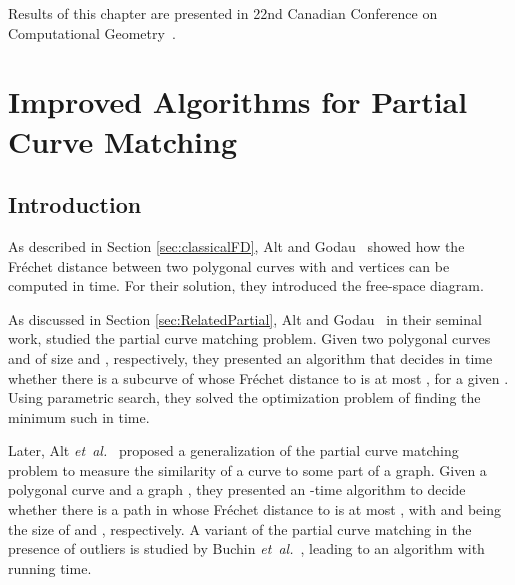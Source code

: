\documentclass[12pt]{dalthesis}
\newcommand{\etal}{{\em et~al.\/}}
\newcommand{\REM}[1]{}
\newcommand{\Frechet}{Fr\'echet }
\newcommand{\fs}{free-space }
\begin{document}
Results of this chapter 
are presented in 22nd Canadian Conference on Computational Geometry~\cite{oursCCCG2010}.
\clearpage{}



\clearpage{}\chapter{Improved Algorithms for Partial Curve Matching}
\label{ch:partial}

\section{Introduction} 
\label{sec:introduction}

\REM{
The \Frechet distance is a widely-used metric for measuring the similarity of the curves. 
It finds applications in morphing~\cite{EfratGHMM02},
handwriting recognition~\cite{SriraghavendraKB07}, protein structure alignment~\cite{JiangXZ08}, etc.
This measure is often illustrated as the minimum-length leash needed for a
person to walk a dog, while each of them is traversing
a pre-specified polygonal curve without backtracking.
}
As described in Section \ref{sec:classicalFD},
Alt and Godau~\cite{AltG95} showed how the 
\Frechet distance between two polygonal curves
with  and  vertices can be computed in  time.
For their solution, they introduced the \fs diagram.
\REM{
The \fs diagram and its variants have been proved to be useful in other applications
involving the \Frechet distance
(see e.g. \cite{AltERW03,BuchinBG10,WenkC10,HR11}).

Various extensions of the \Frechet distance have been studied in the literature,
including \Frechet distance between two curves 
inside a simple polygon~\cite{WenkC10}, on polyhedral surfaces~\cite{CookW09}, and on simplicial complexes~\cite{HR11}.

}

As discussed in Section
\ref{sec:RelatedPartial},
Alt and Godau~\cite{AltG95} 
in their seminal work, 
studied the partial curve matching problem.
Given two polygonal curves  and  of size  and , respectively, 
they presented an algorithm that decides in  time whether
there is a subcurve  of  whose \Frechet distance to  is at most ,
for a given . 
Using parametric search, they solved the optimization problem of finding the minimum such 
in  time.

Later, Alt \etal~\cite{AltERW03a} proposed a generalization of the partial curve matching problem 
to measure the similarity of a curve to some part of a graph.
Given a polygonal curve  and a graph , 
they presented an -time algorithm to decide whether there is a path  in  whose 
\Frechet distance to  is at most , 
with  and  being the size of  and , respectively.
A variant of the partial curve matching
in the presence of outliers is studied by Buchin \etal~\cite{ExactPartial},
leading to an algorithm with  running time.
\end{document}
